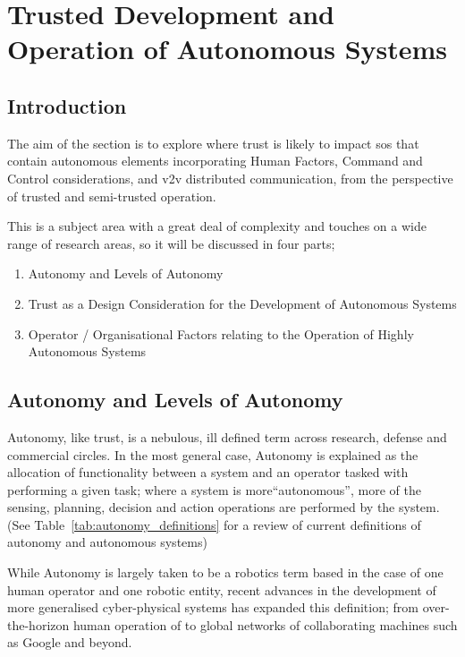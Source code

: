 \section{Trusted Development and Operation of Autonomous Systems}

\subsection{Introduction}

The aim of the section is to explore where trust is likely to impact \acrfull{sos} that contain autonomous elements incorporating Human Factors, Command and Control considerations, and \acrfull{v2v} distributed communication, from the perspective of trusted and semi-trusted operation.

This is a subject area with a great deal of complexity and touches on a wide range of research areas, so it will be discussed in four parts; 
 
\begin{enumerate}
  \item Autonomy and Levels of Autonomy
  \item Trust as a Design Consideration for the Development of Autonomous Systems
  \item Operator / Organisational Factors relating to the Operation of Highly Autonomous Systems
\end{enumerate}

\subsection{Autonomy and Levels of Autonomy}

Autonomy, like trust, is a nebulous, ill defined term across research, defense and commercial circles.
In the most general case, Autonomy is explained as the allocation of functionality between a system and an operator tasked with performing a given task; where a system is more``autonomous'', more of the sensing, planning, decision and action operations are performed by the system. (See Table~\ref{tab:autonomy_definitions} for a review of current definitions of autonomy and autonomous systems)

While Autonomy is largely taken to be a robotics term based in the case of one human operator and one robotic entity, recent advances in the development of more generalised cyber-physical systems has expanded this definition; from over-the-horizon human operation of  to global networks of collaborating machines such as Google and beyond.


